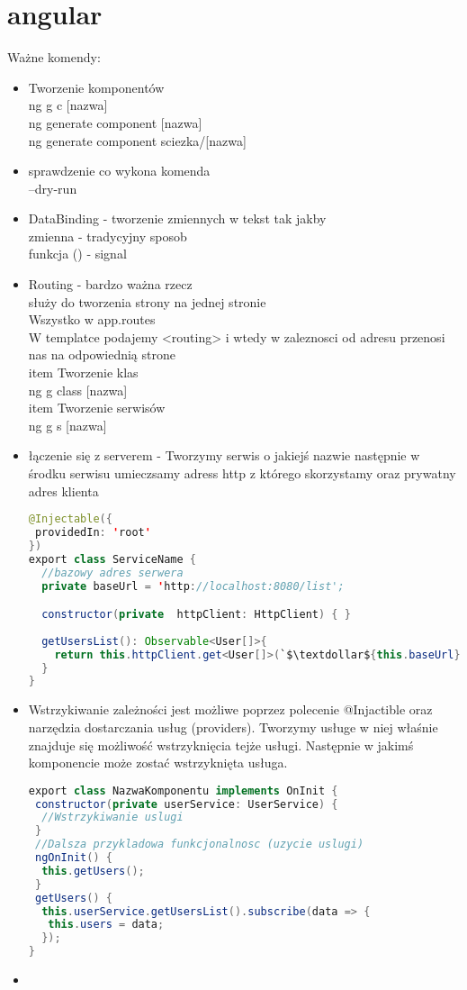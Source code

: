 \section{angular}
Ważne komendy:
\begin{itemize}
	\item Tworzenie komponentów
	\\ng g c [nazwa]
	\\ng generate component [nazwa]
	\\ng generate component sciezka/[nazwa]
	\item sprawdzenie co wykona komenda
	\\ --dry-run
	\item DataBinding - tworzenie zmiennych w tekst tak jakby
	\\ {{ zmienna }} - tradycyjny sposob
	\\ {{ funkcja () }} - signal
	\item Routing - bardzo ważna rzecz
	\\ służy do tworzenia strony na jednej stronie
	\\ Wszystko w app.routes
	\\ W templatce podajemy  <routing> i wtedy w zaleznosci od adresu przenosi nas na odpowiednią strone
	\\item Tworzenie klas 
	\\ng g class [nazwa]
	\\item Tworzenie serwisów
	\\ng g s [nazwa]
	\item łączenie się z serverem - Tworzymy serwis o jakiejś nazwie następnie w środku serwisu umieczsamy adress http z którego skorzystamy oraz prywatny adres klienta
	\begin{lstlisting}[language=Java, caption=Łączenie z serwerem]
@Injectable({
 providedIn: 'root'
})
export class ServiceName {
  //bazowy adres serwera
  private baseUrl = 'http://localhost:8080/list';

  constructor(private  httpClient: HttpClient) { }
	
  getUsersList(): Observable<User[]>{
    return this.httpClient.get<User[]>(`$\textdollar${this.baseUrl}`);
  }
}
	\end{lstlisting}
	\item Wstrzykiwanie zależności jest możliwe poprzez polecenie @Injactible oraz narzędzia dostarczania usług (providers). Tworzymy usługe w niej właśnie znajduje się możliwość wstrzyknięcia tejże usługi. Następnie w jakimś komponencie może zostać wstrzyknięta usługa.
	\begin{lstlisting}[language=Java, caption=Wstrzyknięcie serwisu]
export class NazwaKomponentu implements OnInit {
 constructor(private userService: UserService) {
  //Wstrzykiwanie uslugi
 }
 //Dalsza przykladowa funkcjonalnosc (uzycie uslugi)
 ngOnInit() {
  this.getUsers();
 }
 getUsers() {
  this.userService.getUsersList().subscribe(data => {
   this.users = data;
  });
}
	\end{lstlisting}
	\item 
	
\end{itemize}